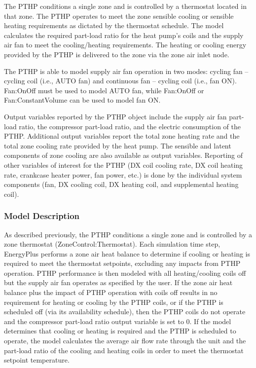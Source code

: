 The PTHP conditions a single zone and is controlled by a thermostat located in that zone. The PTHP operates to meet the zone sensible cooling or sensible heating requirements as dictated by the thermostat schedule. The model calculates the required part-load ratio for the heat pump's coils and the supply air fan to meet the cooling/heating requirements. The heating or cooling energy provided by the PTHP is delivered to the zone via the zone air inlet node.

The PTHP is able to model supply air fan operation in two modes: cycling fan -- cycling coil (i.e., AUTO fan) and continuous fan -- cycling coil (i.e., fan ON). Fan:OnOff must be used to model AUTO fan, while Fan:OnOff or Fan:ConstantVolume can be used to model fan ON.

Output variables reported by the PTHP object include the supply air fan part-load ratio, the compressor part-load ratio, and the electric consumption of the PTHP. Additional output variables report the total zone heating rate and the total zone cooling rate provided by the heat pump. The sensible and latent components of zone cooling are also available as output variables. Reporting of other variables of interest for the PTHP (DX coil cooling rate, DX coil heating rate, crankcase heater power, fan power, etc.) is done by the individual system components (fan, DX cooling coil, DX heating coil, and supplemental heating coil).

\subsubsection{Model Description}\label{model-description-1-008}

As described previously, the PTHP conditions a single zone and is controlled by a zone thermostat (ZoneControl:Thermostat). Each simulation time step, EnergyPlus performs a zone air heat balance to determine if cooling or heating is required to meet the thermostat setpoints, excluding any impacts from PTHP operation. PTHP performance is then modeled with all heating/cooling coils off but the supply air fan operates as specified by the user. If the zone air heat balance plus the impact of PTHP operation with coils off results in no requirement for heating or cooling by the PTHP coils, or if the PTHP is scheduled off (via its availability schedule), then the PTHP coils do not operate and the compressor part-load ratio output variable is set to 0. If the model determines that cooling or heating is required and the PTHP is scheduled to operate, the model calculates the average air flow rate through the unit and the part-load ratio of the cooling and heating coils in order to meet the thermostat setpoint temperature.

